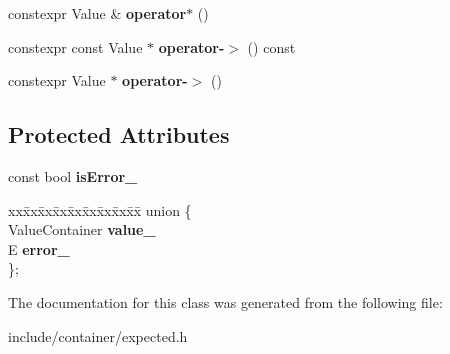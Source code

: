 \begin{DoxyCompactItemize}
\mbox{\label{classbzd_1_1impl_1_1Expected_aea545dc2d222c8e759256fa7734d17bc}} 
constexpr Value \& {\bfseries operator$\ast$} ()
\item 
\mbox{\label{classbzd_1_1impl_1_1Expected_a2f8efa17c7b0b23cd0df19e322299493}} 
constexpr const Value $\ast$ {\bfseries operator-\/$>$} () const
\item 
\mbox{\label{classbzd_1_1impl_1_1Expected_a77fe6c7a8204e0f3f9a765b81248f5c5}} 
constexpr Value $\ast$ {\bfseries operator-\/$>$} ()
\end{DoxyCompactItemize}
\subsection*{Protected Attributes}
\begin{DoxyCompactItemize}
\item 
\mbox{\label{classbzd_1_1impl_1_1Expected_a72ea82e77d599d415899c549d4ff0a04}} 
const bool {\bfseries is\+Error\+\_\+}
\item 
\mbox{\label{classbzd_1_1impl_1_1Expected_ae57c8ae3cf1a867470a311988726f4da}} 
\begin{tabbing}
xx\=xx\=xx\=xx\=xx\=xx\=xx\=xx\=xx\=\kill
union \{\\
\>ValueContainer {\bfseries value\_}\\
\>E {\bfseries error\_}\\
\}; \\

\end{tabbing}\end{DoxyCompactItemize}


The documentation for this class was generated from the following file\+:\begin{DoxyCompactItemize}
\item 
include/container/expected.\+h\end{DoxyCompactItemize}
